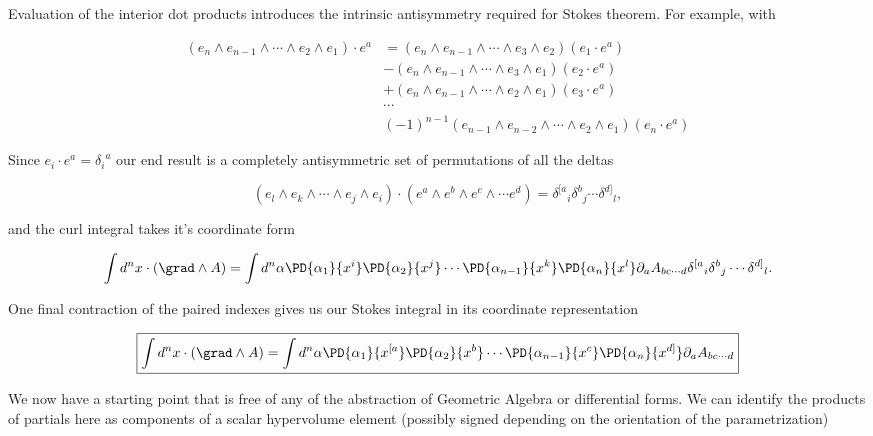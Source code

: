 Evaluation of the interior dot products introduces the intrinsic antisymmetry required for Stokes theorem.  For example, with

\begin{align*}
( e_n \wedge e_{n-1} \wedge \cdots \wedge e_2 \wedge e_1 ) \cdot e^a
&=
( e_n \wedge e_{n-1} \wedge \cdots \wedge e_3 \wedge e_2 ) (e_1 \cdot e^a) \\
&-( e_n \wedge e_{n-1} \wedge \cdots \wedge e_3 \wedge e_1 ) (e_2 \cdot e^a) \\
&+( e_n \wedge e_{n-1} \wedge \cdots \wedge e_2 \wedge e_1 ) (e_3 \cdot e^a) \\
&\cdots \\
&(-1)^{n-1}
( e_{n-1} \wedge e_{n-2} \wedge \cdots \wedge e_2 \wedge e_1 ) (e_n \cdot e^a)
\end{align*}

Since $e_i \cdot e^a = {\delta_i}^a$ our end result is a completely antisymmetric set of permutations of all the deltas

\begin{equation}\label{eqn:stokesTensor:310}
( e_l \wedge e_k \wedge \cdots \wedge e_j \wedge e_i )
\cdot
(e^a \wedge e^b \wedge e^c \wedge \cdots e^d)
=
{\delta^{[a}}_i
{\delta^b}_j
\cdots
{\delta^{d]}}_l,
\end{equation}

and the curl integral takes it's coordinate form

\begin{equation}\label{eqn:stokesTensor:330}
\int d^n x \cdot ( \grad \wedge A ) =
\int
d^n \alpha
\PD{\alpha_1}{x^i}
\PD{\alpha_2}{x^j}
\cdots
\PD{\alpha_{n-1}}{x^k}
\PD{\alpha_n}{x^l}
\partial_a A_{b c \cdots d}
{\delta^{[a}}_i
{\delta^b}_j
\cdots
{\delta^{d]}}_l.
\end{equation}

One final contraction of the paired indexes gives us our Stokes integral in its coordinate representation

\begin{equation}\label{eqn:stokesTensor:350}
\boxed{
\int d^n x \cdot ( \grad \wedge A ) =
\int
d^n \alpha
\PD{\alpha_1}{x^{[a}}
\PD{\alpha_2}{x^b}
\cdots
\PD{\alpha_{n-1}}{x^c}
\PD{\alpha_n}{x^{d]}}
\partial_a A_{b c \cdots d}
}
\end{equation}

We now have a starting point that is free of any of the abstraction of Geometric Algebra or differential forms.  We can identify the products of partials here as components of a scalar hypervolume element (possibly signed depending on the orientation of the parametrization)

